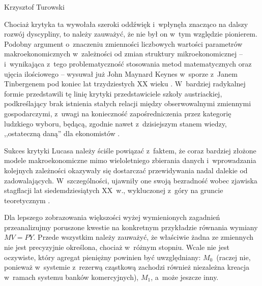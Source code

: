 \begin{artplenv}{Krzysztof Turowski}

Chociaż krytyka ta wywołała szeroki oddźwięk i~wpłynęła znacząco na dalszy rozwój dyscypliny, to należy zauważyć, że nie
był on w~tym względzie pionierem. Podobny argument o~znaczeniu zmienności liczbowych wartości parametrów
makroekonomicznych w~zależności od zmian struktury mikroekonomicznej  --  i~wynikająca z~tego problematyczność
stosowania metod matematycznych oraz ujęcia ilościowego  --  wysuwał już John Maynard Keynes w~sporze z~Janem
Tinbergenem pod koniec lat trzydziestych XX wieku
\parencite{keynes_professor_1939}.
W~bardziej radykalnej formie
przedstawili tę linię krytyki przedstawiciele szkoły austriackiej, podkreślający brak istnienia stałych relacji między
obserwowalnymi zmiennymi gospodarczymi, z~uwagi na konieczność zapośredniczenia przez kategorię ludzkiego wyboru,
będącą, zgodnie nawet z~dzisiejszym stanem wiedzy, ,,ostateczną daną'' dla ekonomistów
\parencite{mises_ludzkie_2007,rothbard_praxeology:_1976}.

Sukces krytyki Lucasa należy ściśle powiązać z~faktem, że coraz bardziej złożone modele makroekonomiczne mimo
wieloletniego zbierania danych i~wprowadzania kolejnych zależności okazywały się dostarczać przewidywania nadal dalekie
od zadowalających. W~szczególności, ujawniły one swoją bezradność wobec zjawiska stagflacji lat siedemdziesiątych
XX~w., wykluczonej z~góry na gruncie teoretycznym
\parencite{kydland_econometrics_1991}.

Dla lepszego zobrazowania większości wyżej wymienionych zagadnień przeanalizujmy poruszone kwestie na konkretnym
przykładzie równania wymiany $MV = PY$. Przede wszystkim należy zauważyć, że właściwie żadna ze zmiennych nie
jest precyzyjnie określona, chociaż w~różnym stopniu. Wcale nie jest oczywiste, który agregat pieniężny powinien być
uwzględniany: $M_0$~(raczej nie, ponieważ w~systemie z~rezerwą cząstkową zachodzi
również niezależna kreacja w~ramach systemu banków komercyjnych), $M_1$, a~może jeszcze
inny.


\end{artplenv}
